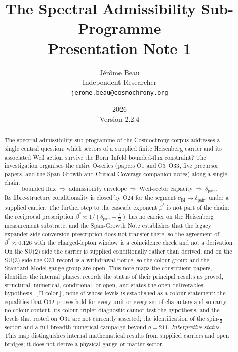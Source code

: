 \documentclass[11pt,a4paper]{article}
\title{The Spectral Admissibility Sub-Programme\\[0.4em]
\large Presentation Note 1}
\author{J\'{e}r\^{o}me Beau\\[0.3em]
\small Independent Researcher\\
\small \texttt{jerome.beau@cosmochrony.org}}
\date{2026\\[2pt]\small Version 2.2.4}
\theoremstyle{definition}
\newcommand{\dimpair}{\delta_{\mathrm{pair}}}
\newcommand{\betastar}{\beta^*}
\newcommand{\cchi}{c_{\mathrm{BI}}}
\begin{document}
  \maketitle

  \begin{abstract}
    The spectral admissibility sub-programme of the Cosmochrony corpus addresses a single
    central question: which sectors of a supplied finite Heisenberg carrier and its associated
    Weil action survive the Born--Infeld bounded-flux constraint?
    The investigation organises the entire O-series (papers O1 and O3--O33, five precursor papers, and
    the Span-Growth and Critical Coverage companion notes) along a single chain:
    \[
      \text{bounded flux}
      \;\Longrightarrow\;
      \text{admissibility envelope}
      \;\Longrightarrow\;
      \text{Weil-sector capacity}
      \;\Longrightarrow\;
      \dimpair .
    \]
    Its fibre-structure conditionality is closed by O24 for the segment
    $\cchi \to \dimpair$, under a supplied carrier.
    The further step to the cascade exponent $\betastar$ is not part of the chain: the
    reciprocal prescription $\betastar \approx 1/(\dimpair + \tfrac{1}{2})$ has no carrier on the
    Heisenberg measurement substrate, and the Span-Growth Note establishes that the
    legacy expander-side conversion prescription does not transfer there, so the agreement of
    $\betastar \approx 0.126$ with the charged-lepton window is a coincidence check and not a
    derivation.
    On the SU(2) side the carrier is supplied conditionally rather than derived, and on the
    SU(3) side the O31 record is a withdrawal notice, so the colour group and the Standard Model
    gauge group are open.
    This note maps the constituent papers, identifies the internal phases, records the
    status of their principal results as proved, structural, numerical, conditional, or open, and states the
    open deliverables: hypothesis~$[\mathrm{H\text{-}color}]$, none of whose levels is established as
    a colour statement: the equalities that O32 proves hold for every unit or every set of characters
    and so carry no colour content, its colour-triplet diagnostic cannot test the hypothesis, and the
    levels that rested on O31 are not currently asserted; the
    identification of the spin-$\tfrac{1}{2}$ sector; and a full-breadth numerical campaign beyond
    $q = 211$.
    \textit{Interpretive status.}
    This map distinguishes internal mathematical results from supplied carriers and open bridges;
    it does not derive a physical gauge or matter sector.
  \end{abstract}
\end{document}
